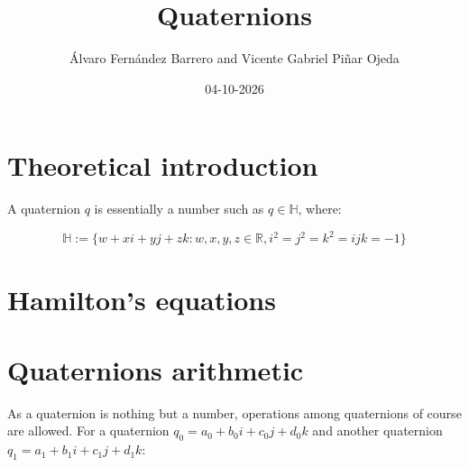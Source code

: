 \documentclass[12pt]{article}
\author{Álvaro Fernández Barrero and Vicente Gabriel Piñar Ojeda}
\title{Quaternions}
\date{04-10-2026}
\begin{document}
	\maketitle
	
	
	\section{Theoretical introduction}
	
	A quaternion $q$ is essentially a number such as $q \in \mathbb{H}$, where:
	
	\[
		\mathbb{H} := \{w + xi + yj + zk : w,x,y,z \in \mathbb{R}, i^2 = j^2 = k^2 = ijk = -1 \}
	\]
	
	
	\section{Hamilton's equations}

	\section{Quaternions arithmetic}
	
	As a quaternion is nothing but a number, operations among quaternions of course are allowed. For a quaternion $q_0 = a_0 + b_0i + c_0j + d_0k$ and another quaternion $q_1 = a_1 + b_1i + c_1j + d_1k$:
	
\end{document}

